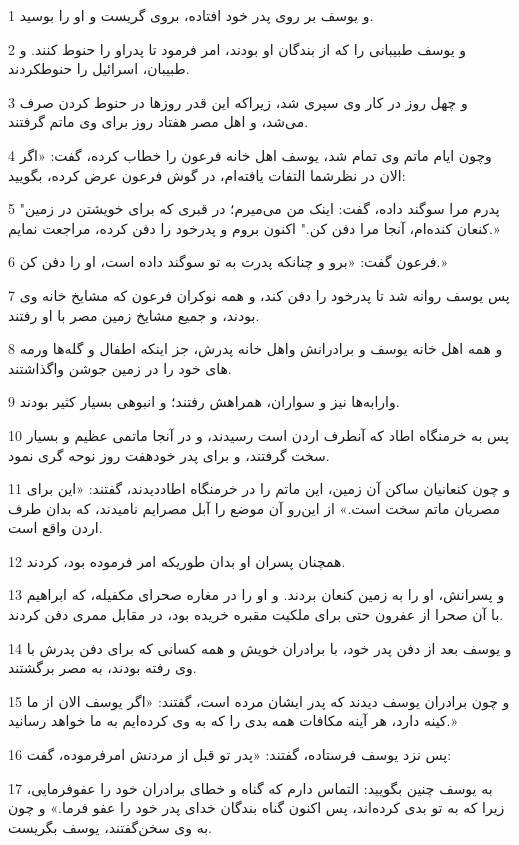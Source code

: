 \par 1 و یوسف بر روی پدر خود افتاده، بروی گریست و او را بوسید.
\par 2 و یوسف طبیبانی را که از بندگان او بودند، امر فرمود تا پدراو را حنوط کنند. و طبیبان، اسرائیل را حنوطکردند.
\par 3 و چهل روز در کار وی سپری شد، زیراکه این قدر روزها در حنوط کردن صرف می‌شد، و اهل مصر هفتاد روز برای وی ماتم گرفتند.
\par 4 وچون ایام ماتم وی تمام شد، یوسف اهل خانه فرعون را خطاب کرده، گفت: «اگر الان در نظرشما التفات یافته‌ام، در گوش فرعون عرض کرده، بگویید:
\par 5 "پدرم مرا سوگند داده، گفت: اینک من می‌میرم؛ در قبری که برای خویشتن در زمین کنعان کنده‌ام، آنجا مرا دفن کن." اکنون بروم و پدرخود را دفن کرده، مراجعت نمایم.»
\par 6 فرعون گفت: «برو و چنانکه پدرت به تو سوگند داده است، او را دفن کن.»
\par 7 پس یوسف روانه شد تا پدرخود را دفن کند، و همه نوکران فرعون که مشایخ خانه وی بودند، و جمیع مشایخ زمین مصر با او رفتند.
\par 8 و همه اهل خانه یوسف و برادرانش واهل خانه پدرش، جز اینکه اطفال و گله‌ها ورمه های خود را در زمین جوشن واگذاشتند.
\par 9 وارابه‌ها نیز و سواران، همراهش رفتند؛ و انبوهی بسیار کثیر بودند.
\par 10 پس به خرمنگاه اطاد که آنطرف اردن است رسیدند، و در آنجا ماتمی عظیم و بسیار سخت گرفتند، و برای پدر خودهفت روز نوحه گری نمود.
\par 11 و چون کنعانیان ساکن آن زمین، این ماتم را در خرمنگاه اطاددیدند، گفتند: «این برای مصریان ماتم سخت است.» از این‌رو آن موضع را آبل مصرایم نامیدند، که بدان طرف اردن واقع است.
\par 12 همچنان پسران او بدان طوریکه امر فرموده بود، کردند.
\par 13 و پسرانش، او را به زمین کنعان بردند. و او را در مغاره صحرای مکفیله، که ابراهیم با آن صحرا از عفرون حتی برای ملکیت مقبره خریده بود، در مقابل ممری دفن کردند.
\par 14 و یوسف بعد از دفن پدر خود، با برادران خویش و همه کسانی که برای دفن پدرش با وی رفته بودند، به مصر برگشتند.
\par 15 و چون برادران یوسف دیدند که پدر ایشان مرده است، گفتند: «اگر یوسف الان از ما کینه دارد، هر آینه مکافات همه بدی را که به وی کرده‌ایم به ما خواهد رسانید.»
\par 16 پس نزد یوسف فرستاده، گفتند: «پدر تو قبل از مردنش امرفرموده، گفت:
\par 17 به یوسف چنین بگویید: التماس دارم که گناه و خطای برادران خود را عفوفرمایی، زیرا که به تو بدی کرده‌اند، پس اکنون گناه بندگان خدای پدر خود را عفو فرما.» و چون به وی سخن‌گفتند، یوسف بگریست.
